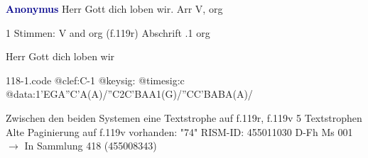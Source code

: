 \documentclass[twocolumn]{book}
\begin{document}
\newline \par \vspace{7pt} \textcolor{darkblue}{\textbf{Anonymus  }}
\newline Herr Gott dich loben wir. Arr
\newline V, org
\newline \begin{itshape}\end{itshape} 
\newline \textcolor{darkblue}{}  1 Stimmen: V and org  (f.119r)
\newline Abschrift
.1  org
\newline \begin{footnotesize} Herr Gott dich loben wir \end{footnotesize}  
\begin{filecontents*}{118-1.code}
@clef:C-1
@keysig:
@timesig:c
@data:1'EGA''C'A(A)/''C2C'BAA1(G)/''CC'BABA(A)/
\end{filecontents*}
\newline
%
\newline Zwischen den beiden Systemen eine Textstrophe auf f.119r, f.119v 5 Textstrophen
\newline Alte Paginierung auf f.119v vorhanden: "74"
\newline RISM-ID: 455011030
\newline D-Fh  Ms 001
\newline $\rightarrow$ In Sammlung 418 (455008343)
      
\end{document}
